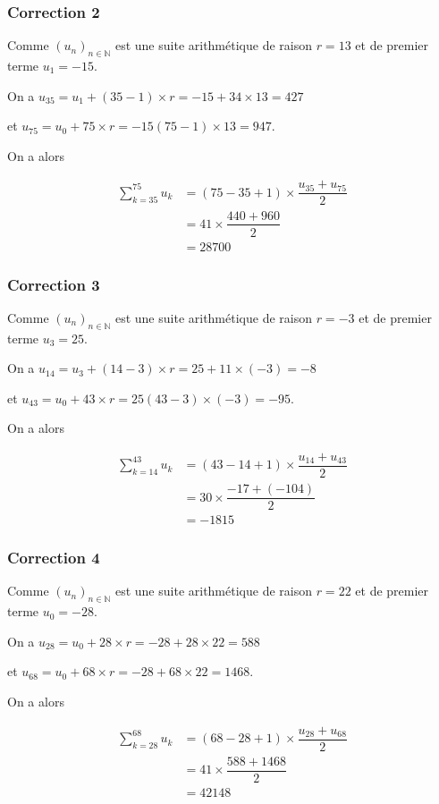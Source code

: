 \documentclass[15pt, mathserif]{beamer}
\begin{document}
\begin{frame}
\vspace{-10mm}
	\frametitle{Correction 2}
Comme $(u_n)_{n\in\mathbb{N}}$ est une suite arithmétique de raison $r = 13$ et de premier terme $u_1=-15$.

 On a $u_{35}= u_1+(35-1)\times r = -15+34\times13 = 427$ 

 et $u_{75} = u_0 + 75\times r = -15(75-1)\times13 = 947$.

On a alors

\begin{align*}\displaystyle\sum_{k=35}^{75} u_k &= (75-35+1) \times \dfrac{u_{35}+u_{75}}{2}\\
	&=41\times \dfrac{440+960}{2}\\
	&=28700
\end{align*}\end{frame}


\begin{frame}
\vspace{-10mm}
	\frametitle{Correction 3}
Comme $(u_n)_{n\in\mathbb{N}}$ est une suite arithmétique de raison $r = -3$ et de premier terme $u_3=25$.

 On a $u_{14}= u_3+(14-3)\times r = 25+11\times\left(-3\right) = -8$ 

 et $u_{43} = u_0 + 43\times r = 25(43-3)\times\left(-3\right) = -95$.

On a alors

\begin{align*}\displaystyle\sum_{k=14}^{43} u_k &= (43-14+1) \times \dfrac{u_{14}+u_{43}}{2}\\
	&=30\times \dfrac{-17+\left(-104\right)}{2}\\
	&=-1815
\end{align*}\end{frame}


\begin{frame}
\vspace{-10mm}
	\frametitle{Correction 4}
Comme $(u_n)_{n\in\mathbb{N}}$ est une suite arithmétique de raison $r = 22$ et de premier terme $u_0=-28$.

 On a $u_{28}= u_0 + 28\times r = -28+28\times22 = 588$ 

 et $u_{68} = u_0 + 68\times r = -28+68\times22 = 1468$.

On a alors

\begin{align*}\displaystyle\sum_{k=28}^{68} u_k &= (68-28+1) \times \dfrac{u_{28}+u_{68}}{2}\\
	&=41\times \dfrac{588+1468}{2}\\
	&=42148
\end{align*}\end{frame}
\end{document}
